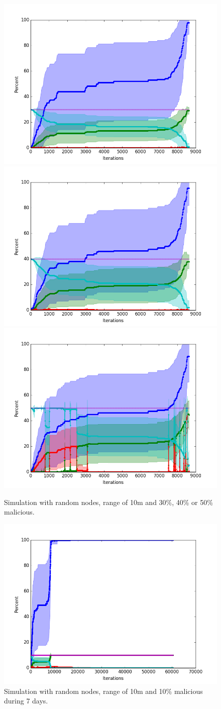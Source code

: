 \documentclass[conference]{IEEEtran}
\begin{document}
\begin{figure}
\centering
\includegraphics[width=0.329\linewidth]{Network_rA/10_30}
\includegraphics[width=0.329\linewidth]{Network_rA/10_40}
\includegraphics[width=0.329\linewidth]{Network_rA/10_50}
\caption{Simulation with random nodes, range of 10m and 30\%, 40\% or 50\% malicious.}
\label{fig:random1}
\end{figure}

%


\begin{figure}
\centering
\includegraphics[width=0.7\linewidth]{Network_rA7/10_10}
\caption{Simulation with random nodes, range of 10m and 10\% malicious during 7 days.} \label{fig:random7}
\end{figure}
\end{document}
